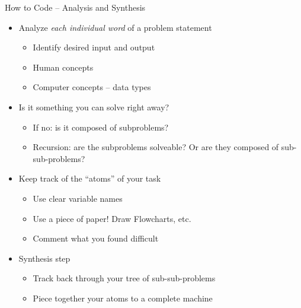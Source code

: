 \begin{frame}[fragile]{How to Code -- Analysis and Synthesis}
%
\begin{itemize}
\item Analyze \emph{each individual word} of a problem statement
	\begin{itemize}
	\item Identify desired input and output
	\item Human concepts
	\item Computer concepts -- data types
	\end{itemize}
	
\item Is it something you can solve right away?
	\begin{itemize}
	\item If no: is it composed of subproblems?
	\item Recursion: are the subproblems solveable? Or are they composed of sub-sub-problems?
	\end{itemize}

\item Keep track of the \enquote{atoms} of your task
	\begin{itemize}
	\item Use clear variable names
	\item Use a piece of paper! Draw Flowcharts, etc.
	\item Comment what you found difficult
	\end{itemize}

\item Synthesis step
	\begin{itemize}
	\item Track back through your tree of sub-sub-problems
	\item Piece together your atoms to a complete machine
	\end{itemize}
\end{itemize}
%
\end{frame}


